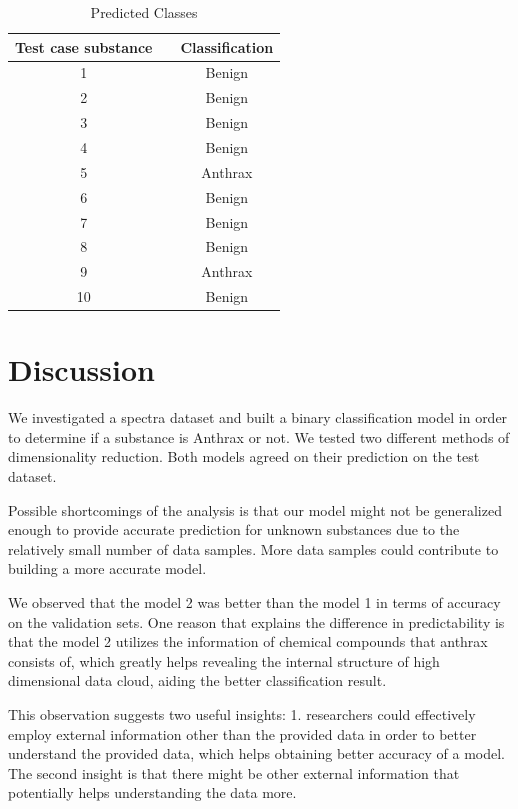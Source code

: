 \documentclass[12pt,onecolumn,letterpaper]{article}
\begin{document}
\begin{table}[hbtp]
  \caption{Predicted Classes} 
  \label{table:prediction}
  \centering
  \begin{tabular}{ccc}
    \hline
    Test case substance  &       &  Classification  \\
    \hline \hline
    1  &   &  Benign \\
    2  &    & Benign \\
    3  &   &  Benign \\
    4  &    &  Benign \\
    5  &    &  Anthrax \\
    6  &    &  Benign \\
    7  &    &  Benign \\
    8  &    &  Benign \\
    9  &    &  Anthrax \\
    10  &    &  Benign \\
    \hline
  \end{tabular}
\end{table}



\section{Discussion}

We investigated a spectra dataset and built a binary classification model in order to determine if a substance is Anthrax or not. We tested two different methods of dimensionality reduction. Both models agreed on their prediction on the test dataset.  

Possible shortcomings of the analysis is that our model might not be generalized enough to provide accurate prediction for unknown substances due to the relatively small number of data samples. More data samples could contribute to building a more accurate model. 

We observed that the model 2 was better than the model 1 in terms of accuracy on the validation sets. One reason that explains the difference in predictability is that the model 2 utilizes the information of chemical compounds that anthrax consists of, which greatly helps revealing the internal structure of high dimensional data cloud, aiding the better classification result. 

This observation suggests two useful insights: 1. researchers could effectively employ external information other than the provided data in order to better understand the provided data, which helps obtaining better accuracy of a model. The second insight is that there might be other external information that potentially helps understanding the data more.   
\end{document}
